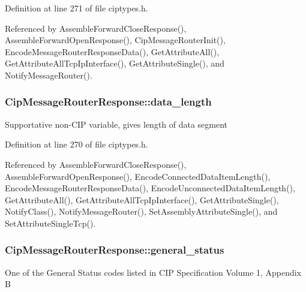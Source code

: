 \-Definition at line 271 of file ciptypes.\-h.



\-Referenced by \-Assemble\-Forward\-Close\-Response(), \-Assemble\-Forward\-Open\-Response(), \-Cip\-Message\-Router\-Init(), \-Encode\-Message\-Router\-Response\-Data(), \-Get\-Attribute\-All(), \-Get\-Attribute\-All\-Tcp\-Ip\-Interface(), \-Get\-Attribute\-Single(), and \-Notify\-Message\-Router().

\hypertarget{structCipMessageRouterResponse_a1b6548497e7629c815b6f71b8dbaecbb}{
\subsubsection[{data\-\_\-length}]{ {\bf \-Cip\-Message\-Router\-Response\-::data\-\_\-length}}}\label{d0/d1f/structCipMessageRouterResponse_a1b6548497e7629c815b6f71b8dbaecbb}
\-Supportative non-\/\-C\-I\-P variable, gives length of data segment 

\-Definition at line 270 of file ciptypes.\-h.



\-Referenced by \-Assemble\-Forward\-Close\-Response(), \-Assemble\-Forward\-Open\-Response(), \-Encode\-Connected\-Data\-Item\-Length(), \-Encode\-Message\-Router\-Response\-Data(), \-Encode\-Unconnected\-Data\-Item\-Length(), \-Get\-Attribute\-All(), \-Get\-Attribute\-All\-Tcp\-Ip\-Interface(), \-Get\-Attribute\-Single(), \-Notify\-Class(), \-Notify\-Message\-Router(), \-Set\-Assembly\-Attribute\-Single(), and \-Set\-Attribute\-Single\-Tcp().

\hypertarget{structCipMessageRouterResponse_ac41c087aef657407542cb640cdb44414}{
\subsubsection[{general\-\_\-status}]{ {\bf \-Cip\-Message\-Router\-Response\-::general\-\_\-status}}}\label{d0/d1f/structCipMessageRouterResponse_ac41c087aef657407542cb640cdb44414}
\-One of the \-General \-Status codes listed in \-C\-I\-P \-Specification \-Volume 1, \-Appendix \-B 

